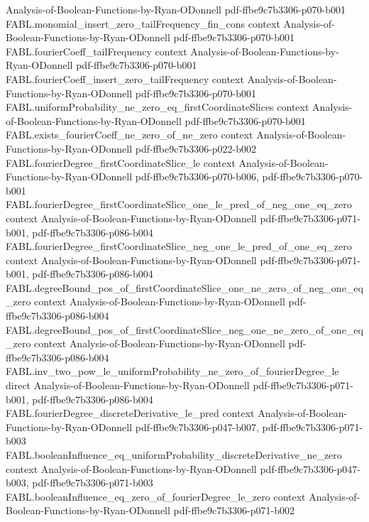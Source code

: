 \begin{theorem}
  {Analysis-of-Boolean-Functions-by-Ryan-ODonnell}
  {pdf-ffbe9c7b3306-p070-b001}
\proofstep
  {FABL.monomial_insert_zero_tailFrequency_fin_cons}
  {context}
  {Analysis-of-Boolean-Functions-by-Ryan-ODonnell}
  {pdf-ffbe9c7b3306-p070-b001}
\proofstep
  {FABL.fourierCoeff_tailFrequency}
  {context}
  {Analysis-of-Boolean-Functions-by-Ryan-ODonnell}
  {pdf-ffbe9c7b3306-p070-b001}
\proofstep
  {FABL.fourierCoeff_insert_zero_tailFrequency}
  {context}
  {Analysis-of-Boolean-Functions-by-Ryan-ODonnell}
  {pdf-ffbe9c7b3306-p070-b001}
\proofstep
  {FABL.uniformProbability_ne_zero_eq_firstCoordinateSlices}
  {context}
  {Analysis-of-Boolean-Functions-by-Ryan-ODonnell}
  {pdf-ffbe9c7b3306-p070-b001}
\proofstep
  {FABL.exists_fourierCoeff_ne_zero_of_ne_zero}
  {context}
  {Analysis-of-Boolean-Functions-by-Ryan-ODonnell}
  {pdf-ffbe9c7b3306-p022-b002}
\proofstep
  {FABL.fourierDegree_firstCoordinateSlice_le}
  {context}
  {Analysis-of-Boolean-Functions-by-Ryan-ODonnell}
  {pdf-ffbe9c7b3306-p070-b006,
    pdf-ffbe9c7b3306-p070-b001}
\proofstep
  {FABL.fourierDegree_firstCoordinateSlice_one_le_pred_of_neg_one_eq_zero}
  {context}
  {Analysis-of-Boolean-Functions-by-Ryan-ODonnell}
  {pdf-ffbe9c7b3306-p071-b001,
    pdf-ffbe9c7b3306-p086-b004}
\proofstep
  {FABL.fourierDegree_firstCoordinateSlice_neg_one_le_pred_of_one_eq_zero}
  {context}
  {Analysis-of-Boolean-Functions-by-Ryan-ODonnell}
  {pdf-ffbe9c7b3306-p071-b001,
    pdf-ffbe9c7b3306-p086-b004}
\proofstep
  {FABL.degreeBound_pos_of_firstCoordinateSlice_one_ne_zero_of_neg_one_eq_zero}
  {context}
  {Analysis-of-Boolean-Functions-by-Ryan-ODonnell}
  {pdf-ffbe9c7b3306-p086-b004}
\proofstep
  {FABL.degreeBound_pos_of_firstCoordinateSlice_neg_one_ne_zero_of_one_eq_zero}
  {context}
  {Analysis-of-Boolean-Functions-by-Ryan-ODonnell}
  {pdf-ffbe9c7b3306-p086-b004}
\proofstep
  {FABL.inv_two_pow_le_uniformProbability_ne_zero_of_fourierDegree_le}
  {direct}
  {Analysis-of-Boolean-Functions-by-Ryan-ODonnell}
  {pdf-ffbe9c7b3306-p071-b001,
    pdf-ffbe9c7b3306-p086-b004}
\proofstep
  {FABL.fourierDegree_discreteDerivative_le_pred}
  {context}
  {Analysis-of-Boolean-Functions-by-Ryan-ODonnell}
  {pdf-ffbe9c7b3306-p047-b007,
    pdf-ffbe9c7b3306-p071-b003}
\proofstep
  {FABL.booleanInfluence_eq_uniformProbability_discreteDerivative_ne_zero}
  {context}
  {Analysis-of-Boolean-Functions-by-Ryan-ODonnell}
  {pdf-ffbe9c7b3306-p047-b003,
    pdf-ffbe9c7b3306-p071-b003}
\proofstep
  {FABL.booleanInfluence_eq_zero_of_fourierDegree_le_zero}
  {context}
  {Analysis-of-Boolean-Functions-by-Ryan-ODonnell}
  {pdf-ffbe9c7b3306-p071-b002}

\end{theorem}
